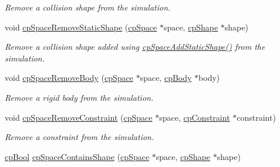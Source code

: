 \begin{DoxyCompactItemize}
\begin{DoxyCompactList}\small\item\em Remove a collision shape from the simulation. \end{DoxyCompactList}\item 
\hypertarget{group__cp_space_gacec20f95fdfcf59a6795ba60cc9c7e8a}{void \hyperlink{group__cp_space_gacec20f95fdfcf59a6795ba60cc9c7e8a}{cp\-Space\-Remove\-Static\-Shape} (\hyperlink{structcp_space}{cp\-Space} $\ast$space, \hyperlink{structcp_shape}{cp\-Shape} $\ast$shape)}\label{group__cp_space_gacec20f95fdfcf59a6795ba60cc9c7e8a}

\begin{DoxyCompactList}\small\item\em Remove a collision shape added using \hyperlink{group__cp_space_gab4c74f809628d9b8330f3e2259575759}{cp\-Space\-Add\-Static\-Shape()} from the simulation. \end{DoxyCompactList}\item 
\hypertarget{group__cp_space_gad2c0aab926b1796bb38deee21d8a9ef1}{void \hyperlink{group__cp_space_gad2c0aab926b1796bb38deee21d8a9ef1}{cp\-Space\-Remove\-Body} (\hyperlink{structcp_space}{cp\-Space} $\ast$space, \hyperlink{structcp_body}{cp\-Body} $\ast$body)}\label{group__cp_space_gad2c0aab926b1796bb38deee21d8a9ef1}

\begin{DoxyCompactList}\small\item\em Remove a rigid body from the simulation. \end{DoxyCompactList}\item 
\hypertarget{group__cp_space_gae6a15d5809c8ca1cd786518b0198061b}{void \hyperlink{group__cp_space_gae6a15d5809c8ca1cd786518b0198061b}{cp\-Space\-Remove\-Constraint} (\hyperlink{structcp_space}{cp\-Space} $\ast$space, \hyperlink{structcp_constraint}{cp\-Constraint} $\ast$constraint)}\label{group__cp_space_gae6a15d5809c8ca1cd786518b0198061b}

\begin{DoxyCompactList}\small\item\em Remove a constraint from the simulation. \end{DoxyCompactList}\item 
\hypertarget{group__cp_space_ga24236a160025c41df498804da57ebc08}{\hyperlink{group__basic_types_gab6e5d8afee598a57cd323abae5310244}{cp\-Bool} \hyperlink{group__cp_space_ga24236a160025c41df498804da57ebc08}{cp\-Space\-Contains\-Shape} (\hyperlink{structcp_space}{cp\-Space} $\ast$space, \hyperlink{structcp_shape}{cp\-Shape} $\ast$shape)}\label{group__cp_space_ga24236a160025c41df498804da57ebc08}


\end{DoxyCompactItemize}
